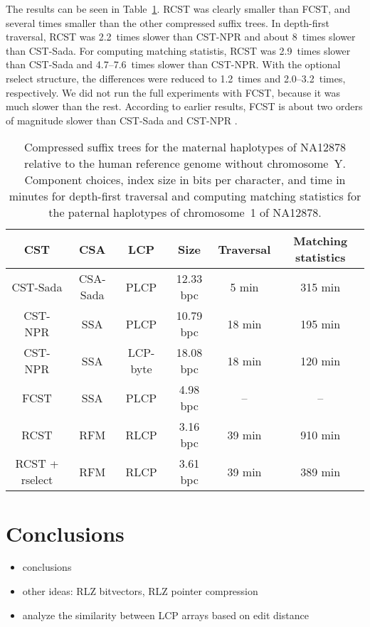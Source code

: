 \documentclass[a4paper,11pt]{llncs}
\newcommand{\CST}{\textsf{CST}}
\newcommand{\CSTsada}{\textsf{CST\nobreakdash-Sada}}
\newcommand{\FCST}{\textsf{FCST}}
\newcommand{\CSTnpr}{\textsf{CST\nobreakdash-NPR}}
\newcommand{\RCST}{\textsf{RCST}}
\newcommand{\CSA}{\textsf{CSA}}
\newcommand{\SSA}{\textsf{SSA}}
\newcommand{\CSAsada}{\textsf{CSA-Sada}}
\newcommand{\RFM}{\textsf{RFM}}
\newcommand{\LCP}{\textsf{LCP}}
\newcommand{\PLCP}{\textsf{PLCP}}
\newcommand{\RLCP}{\textsf{RLCP}}
\newcommand{\LCPbyte}{\textsf{LCP\nobreakdash-byte}}
\newcommand{\rselect}{\textsf{rselect}}
\begin{document}
The results can be seen in Table~\ref{table:cst}. \RCST{} was clearly smaller than \FCST, and several times smaller than the other compressed suffix trees. In depth-first traversal, \RCST{} was 2.2~times slower than \CSTnpr{} and about 8~times slower than \CSTsada. For computing matching statistis, \RCST{} was 2.9~times slower than \CSTsada{} and 4.7\nobreakdash--7.6~times slower than \CSTnpr{}. With the optional \rselect{} structure, the differences were reduced to 1.2~times and 2.0\nobreakdash--3.2~times, respectively. We did not run the full experiments with \FCST, because it was much slower than the rest. According to earlier results, \FCST{} is about two orders of magnitude slower than \CSTsada{} and \CSTnpr{} \cite{Abeliuk2013}.

\begin{table}
\caption{Compressed suffix trees for the maternal haplotypes of NA12878 relative to the human reference genome without chromosome~Y. Component choices, index size in bits per character, and time in minutes for depth-first traversal and computing matching statistics for the paternal haplotypes of chromosome~1 of NA12878.}\label{table:cst}
\setlength{\extrarowheight}{2pt}
\setlength{\tabcolsep}{3pt}
\begin{center}
\begin{tabular}{c|cc|c|c|c}
\hline
\textbf{\CST} & \textbf{\CSA} & \textbf{\LCP} & \textbf{Size} & \textbf{Traversal} & \textbf{Matching statistics} \\
\hline
\CSTsada           & \CSAsada & \PLCP    & 12.33 bpc &  5 min & 315 min \\
\CSTnpr            & \SSA     & \PLCP    & 10.79 bpc & 18 min & 195 min \\
\CSTnpr            & \SSA     & \LCPbyte & 18.08 bpc & 18 min & 120 min \\
\FCST              & \SSA     & \PLCP    &  4.98 bpc &     -- &      -- \\
\RCST              & \RFM     & \RLCP    &  3.16 bpc & 39 min & 910 min \\
\RCST{} + \rselect & \RFM     & \RLCP    &  3.61 bpc & 39 min & 389 min \\
\hline
\end{tabular}
\end{center}
\end{table}


\section{Conclusions}\label{section:conclusions}

\begin{itemize}
\item conclusions
\item other ideas: RLZ bitvectors, RLZ pointer compression
\item analyze the similarity between LCP arrays based on edit distance
\end{itemize}




\end{document}
